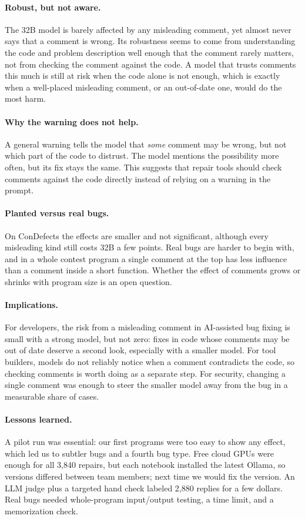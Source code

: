 \documentclass[sigconf,nonacm]{acmart}
\newcommand{\cd}{ConDefects}
\begin{document}
\paragraph{Robust, but not aware.} The 32B model is barely affected by any misleading comment, yet almost never says that a comment is wrong. Its robustness seems to come from understanding the code and problem description well enough that the comment rarely matters, not from checking the comment against the code. A model that trusts comments this much is still at risk when the code alone is not enough, which is exactly when a well-placed misleading comment, or an out-of-date one, would do the most harm.

\paragraph{Why the warning does not help.} A general warning tells the model that \emph{some} comment may be wrong, but not which part of the code to distrust. The model mentions the possibility more often, but its fix stays the same. This suggests that repair tools should check comments against the code directly instead of relying on a warning in the prompt.

\paragraph{Planted versus real bugs.} On \cd{} the effects are smaller and not significant, although every misleading kind still costs 32B a few points. Real bugs are harder to begin with, and in a whole contest program a single comment at the top has less influence than a comment inside a short function. Whether the effect of comments grows or shrinks with program size is an open question.

\paragraph{Implications.} For developers, the risk from a misleading comment in AI-assisted bug fixing is small with a strong model, but not zero: fixes in code whose comments may be out of date deserve a second look, especially with a smaller model. For tool builders, models do not reliably notice when a comment contradicts the code, so checking comments is worth doing as a separate step. For security, changing a single comment was enough to steer the smaller model away from the bug in a measurable share of cases.

\paragraph{Lessons learned.} A pilot run was essential: our first programs were too easy to show any effect, which led us to subtler bugs and a fourth bug type. Free cloud GPUs were enough for all 3,840 repairs, but each notebook installed the latest Ollama, so versions differed between team members; next time we would fix the version. An LLM judge plus a targeted hand check labeled 2,880 replies for a few dollars. Real bugs needed whole-program input/output testing, a time limit, and a memorization check.
\end{document}
